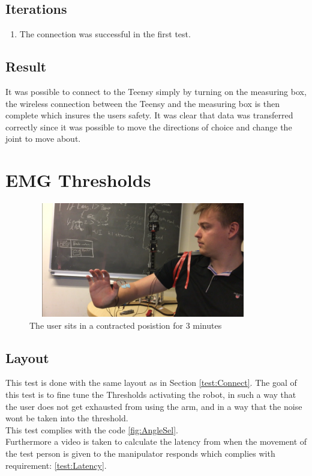 \subsection*{Iterations}
\begin{enumerate}
    \item The connection was successful in the first test.
\end{enumerate}
\subsection*{Result}
 It was possible to connect to the Teensy simply by turning on the measuring box, the wireless connection between the Teensy and the measuring box is then complete which insures the users safety. It was clear that data was transferred correctly since it was possible to move the directions of choice and change the joint to move about.\\
\newpage
\section*{EMG Thresholds}
\begin{figure}[H]
    \centering
    \includegraphics[width=10cm,height=5cm]{Figures/Technical_figures/image2.png}
    \caption{The user sits in a contracted posistion for 3 minutes}
    \label{fig:connectiontest}
\end{figure}
\subsection*{Layout}
This test is done with the same layout as in Section \ref{test:Connect}. The goal of this test is to fine tune the Thresholds activating the robot, in such a way that the user does not get exhausted from using the arm, and in a way that the noise wont be taken into the threshold.\\
This test complies with the code \ref{fig:AngleSel}.\\
Furthermore a video is taken to calculate the latency from  when the movement of the test person is given to the manipulator responds which complies with requirement: \ref{test:Latency}.
